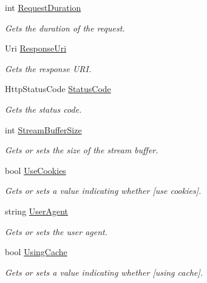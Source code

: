 \begin{DoxyCompactItemize}
int \hyperlink{class_html_agility_pack_1_1_html_web_a26c97bc5d4f5527ef6f0643927ae2d0b}{Request\+Duration}
\begin{DoxyCompactList}\small\item\em Gets the duration of the request. \end{DoxyCompactList}\item 
Uri \hyperlink{class_html_agility_pack_1_1_html_web_ab3a33773bca997bb42e6a266375ca488}{Response\+Uri}
\begin{DoxyCompactList}\small\item\em Gets the response U\+RI. \end{DoxyCompactList}\item 
Http\+Status\+Code \hyperlink{class_html_agility_pack_1_1_html_web_a987c0accddc24be0792807bdec584b55}{Status\+Code}
\begin{DoxyCompactList}\small\item\em Gets the status code. \end{DoxyCompactList}\item 
int \hyperlink{class_html_agility_pack_1_1_html_web_a80df8e74a22d9aa8d8d28bc978820d9e}{Stream\+Buffer\+Size}
\begin{DoxyCompactList}\small\item\em Gets or sets the size of the stream buffer. \end{DoxyCompactList}\item 
bool \hyperlink{class_html_agility_pack_1_1_html_web_a91e4fac63eecfef7df6c0825e518bd59}{Use\+Cookies}
\begin{DoxyCompactList}\small\item\em Gets or sets a value indicating whether \mbox{[}use cookies\mbox{]}. \end{DoxyCompactList}\item 
string \hyperlink{class_html_agility_pack_1_1_html_web_a492089f2da916c27e99fb6bb732938df}{User\+Agent}
\begin{DoxyCompactList}\small\item\em Gets or sets the user agent. \end{DoxyCompactList}\item 
bool \hyperlink{class_html_agility_pack_1_1_html_web_a4937827277fc08dacaef28144d2e48b5}{Using\+Cache}
\begin{DoxyCompactList}\small\item\em Gets or sets a value indicating whether \mbox{[}using cache\mbox{]}. \end{DoxyCompactList}\end{DoxyCompactItemize}


